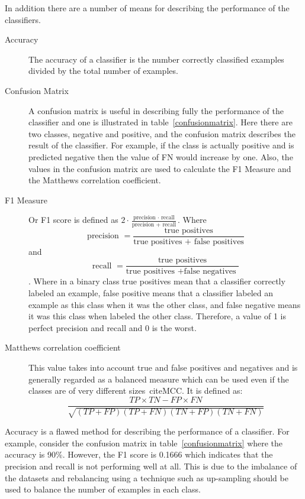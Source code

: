 \documentclass[titlepage, letterpaper, 12pt]{article}
\begin{document}
In addition there are a number of means for describing the performance of the classifiers.
\begin{description}
	\item[Accuracy] The accuracy of a classifier is the number correctly classified examples divided by the total number of examples. 
	\item[Confusion Matrix] A confusion matrix is useful in describing fully the performance of the classifier and one is illustrated in table~\ref{confusionmatrix}.  Here there are two classes, negative and positive, and the confusion matrix describes the result of the classifier.  For example, if the class is actually positive and is predicted negative then the value of FN would increase by one.  Also, the values in the confusion matrix are used to calculate the F1 Measure and the Matthews correlation coefficient.
	\item[F1 Measure] Or F1 score is defined as \(2\cdot \frac{\textrm{precision }\cdot \textrm{ recall}}{\textrm{precision }+\textrm{ recall}}\).  Where \[\textrm{precision } = \frac{\textrm{true positives}}{\textrm{true positives } + \textrm{ false positives}}\] and \[\textrm{recall } = \frac{\textrm{true positives}}{\textrm{true positives } + \textrm{false negatives }}\].  Where in a binary class true positives mean that a classifier correctly labeled an example, false positive means that a classifier labeled an example as this class when it was the other class, and false negative means it was this class when labeled the other class.  Therefore, a value of 1 is perfect precision and recall and 0 is the worst.
	\item[Matthews correlation coefficient] This value takes into account true and false positives and negatives and is generally regarded as a balanced measure which can be used even if the classes are of very different sizes~cite{MCC}.  It is defined as: \[\frac{TP\times TN - FP \times FN}{\sqrt{(TP + FP)(TP + FN)(TN+FP)(TN+FN)}} \]
\end{description}

Accuracy is a flawed method for describing the performance of a classifier.  For example, consider the confusion matrix in table~\ref{confusionmatrix} where the accuracy is 90\%.  However, the F1 score is 0.1666 which indicates that the precision and recall is not performing well at all.  This is due to the imbalance of the datasets and rebalancing using a technique such as up-sampling should be used to balance the number of examples in each class.
\end{document}
